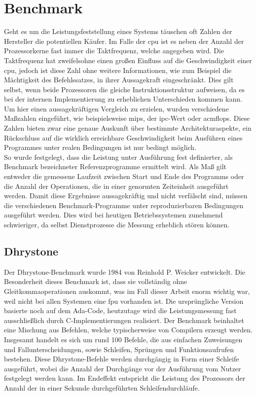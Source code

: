 \section{Benchmark}\label{kap:benchmark}
Geht es um die Leistungsfeststellung eines Systems täuschen oft Zahlen der Hersteller die potentiellen Käufer. Im Falle der \ac{cpu} ist es neben der Anzahl der Prozessorkerne
 fast immer die Taktfrequenz, welche angegeben wird.
Die Taktfrequenz hat zweifelsohne einen großen Einfluss auf die Geschwindigkeit einer \ac{cpu}, jedoch ist diese Zahl ohne weitere Informationen, wie zum Beispiel die
Mächtigkeit des Befehlssatzes, in ihrer Aussagekraft eingeschränkt. Dies gilt selbst, wenn beide Prozessoren die gleiche Instruktionsstruktur aufweisen, da es bei der
internen Implementierung zu erheblichen Unterschieden kommen kann. \\
Um hier einen aussagekräftigen Vergleich zu erzielen, wurden verschiedene Maßzahlen eingeführt, wie beispielsweise \ac{mips}, der \ac{ipc}-Wert oder ac{mflops}. Diese
 Zahlen bieten zwar eine genaue Auskunft über bestimmte Architekturaspekte, ein Rückschluss auf die wirklich erreichbare Geschwindigkeit beim Ausführen eines Programmes
 unter realen Bedingungen ist nur bedingt möglich. \\
So wurde festgelegt, dass die Leistung unter Ausführung fest definierter, als Benchmark bezeichneter Referenzprogramme ermittelt wird. Als Maß gilt entweder die gemessene
 Laufzeit zwischen Start und Ende des Programms oder die Anzahl der Operationen, die in einer genormten Zeiteinheit ausgeführt werden. Damit diese Ergebnisse aussagekräftig
 und nicht verfälscht sind, müssen die verschiedenen Benchmark-Programme unter reproduzierbaren Bedingungen ausgeführt werden. Dies wird bei heutigen Betriebssystemen zunehmend
  schwieriger, da selbst Dienstprozesse die Messung erheblich stören können.~\cite{benchmark}

\subsection{Dhrystone}\label{kap:dhrystone}
Der Dhrystone-Benchmark wurde 1984 von Reinhold P. Weicker entwickelt. Die Besonderheit dieses Benchmark ist, dass sie vollständig
ohne Gleitkommaoperationen auskommt, was im Fall dieser Arbeit enorm wichtig war, weil nicht bei allen Systemen eine \ac{fpu} vorhanden ist.
Die ursprüngliche Version basierte noch auf dem Ada-Code, heutzutage wird die Leistungsmessung fast ausschließlich durch C-Implementierungen
 realisiert. Der Benchmark beinhaltet eine Mischung aus Befehlen, welche typischerweise von Compilern erzeugt werden. Insgesamt handelt es sich
 um rund 100 Befehle, die aus einfachen Zuweisungen und Fallunterscheidungen, sowie Schleifen, Sprüngen und Funktionsaufrufen bestehen.
  Diese Dhrystone-Befehle werden durchgängig in Form einer Schleife ausgeführt, wobei die Anzahl der Durchgänge vor der Ausführung vom
  Nutzer festgelegt werden kann. Im Endeffekt entspricht die Leistung des Prozessors der Anzahl der in einer Sekunde durchgeführten Schleifendurchläufe.~\cite{benchmark}

